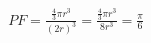 \documentclass[preview]{standalone}
\begin{document}
\begin{align*}
PF=\frac{\frac{4}{3}\pi r^{3}}{(2r)^{3}}=\frac{\frac{4}{3}\pi r^{3}}{8r^{3}}=\frac{\pi}{6}
\end{align*}
\end{document}
